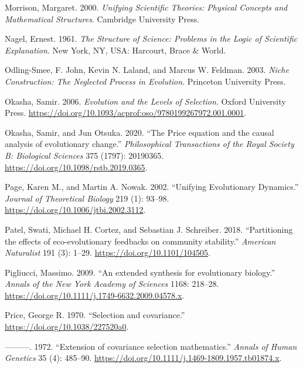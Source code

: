 \documentclass[
]{article}
\newlength{\cslhangindent}
\newlength{\cslentryspacingunit} %
\newenvironment{CSLReferences}[2] %
 {%
  \setlength{\parindent}{0pt}
  \ifodd #1
  \let\oldpar\par
  \def\par{\hangindent=\cslhangindent\oldpar}
  \fi
  \setlength{\parskip}{#2\cslentryspacingunit}
 }%
 {}
\begin{document}
\begin{CSLReferences}{1}{0}
\leavevmode{}%
Morrison, Margaret. 2000. \emph{Unifying Scientific Theories: Physical
Concepts and Mathematical Structures}. Cambridge University Press.

\leavevmode{}%
Nagel, Ernest. 1961. \emph{The Structure of Science: Problems in the
Logic of Scientific Explanation}. New York, NY, USA: Harcourt, Brace \&
World.

\leavevmode{}%
Odling-Smee, F. John, Kevin N. Laland, and Marcus W. Feldman. 2003.
\emph{Niche Construction: The Neglected Process in Evolution}. Princeton
University Press.

\leavevmode{}%
Okasha, Samir. 2006. \emph{Evolution and the Levels of Selection}.
Oxford University Press.
\url{https://doi.org/10.1093/acprof:oso/9780199267972.001.0001}.

\leavevmode{}%
Okasha, Samir, and Jun Otsuka. 2020. {``{The Price equation and the
causal analysis of evolutionary change}.''} \emph{Philosophical
Transactions of the Royal Society B: Biological Sciences} 375 (1797):
20190365. \url{https://doi.org/10.1098/rstb.2019.0365}.

\leavevmode{}%
Page, Karen M., and Martin A. Nowak. 2002. {``Unifying Evolutionary
Dynamics.''} \emph{Journal of Theoretical Biology} 219 (1): 93--98.
\url{https://doi.org/10.1006/jtbi.2002.3112}.

\leavevmode{}%
Patel, Swati, Michael H. Cortez, and Sebastian J. Schreiber. 2018.
{``{Partitioning the effects of eco-evolutionary feedbacks on community
stability}.''} \emph{American Naturalist} 191 (3): 1--29.
\url{https://doi.org/10.1101/104505}.

\leavevmode{}%
Pigliucci, Massimo. 2009. {``{An extended synthesis for evolutionary
biology}.''} \emph{Annals of the New York Academy of Sciences} 1168:
218--28. \url{https://doi.org/10.1111/j.1749-6632.2009.04578.x}.

\leavevmode{}%
Price, George R. 1970. {``{Selection and covariance}.''}
\url{https://doi.org/10.1038/227520a0}.

\leavevmode{}%
---------. 1972. {``{Extension of covariance selection mathematics}.''}
\emph{Annals of Human Genetics} 35 (4): 485--90.
\url{https://doi.org/10.1111/j.1469-1809.1957.tb01874.x}.


\end{CSLReferences}
\end{document}
